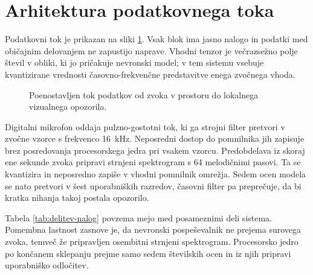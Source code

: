 \section{Arhitektura podatkovnega toka}

Podatkovni tok je prikazan na sliki \ref{fig:podatkovni-tok}. Vsak blok ima
jasno nalogo in podatki med običajnim delovanjem ne zapustijo naprave.
Vhodni tenzor je večrazsežno polje števil v obliki, ki jo pričakuje nevronski
model; v tem sistemu vsebuje kvantizirane vrednosti časovno-frekvenčne
predstavitve enega zvočnega vhoda.

\begin{figure}[htbp]
  \centering
  \caption{Poenostavljen tok podatkov od zvoka v prostoru do lokalnega
  vizualnega opozorila.}
  \label{fig:podatkovni-tok}
\end{figure}

Digitalni mikrofon oddaja pulzno-gostotni tok, ki ga strojni filter pretvori v
zvočne vzorce s frekvenco \SI{16}{\kilo\hertz}. Neposredni dostop do pomnilnika
jih zapisuje brez posredovanja procesorskega jedra pri vsakem vzorcu.
Predobdelava iz skoraj ene sekunde zvoka pripravi strnjeni spektrogram s 64
melodičnimi pasovi. Ta se kvantizira in neposredno zapiše v vhodni pomnilnik
omrežja. Sedem ocen modela se nato pretvori v šest uporabniških razredov,
časovni filter pa preprečuje, da bi kratka nihanja takoj postala opozorilo.

Tabela \ref{tab:delitev-nalog} povzema mejo med posameznimi deli sistema.
Pomembna lastnost zasnove je, da nevronski pospeševalnik ne prejema surovega
zvoka, temveč že pripravljen osembitni strnjeni spektrogram. Procesorsko jedro po
končanem sklepanju prejme samo sedem številskih ocen in iz njih pripravi
uporabniško odločitev.

